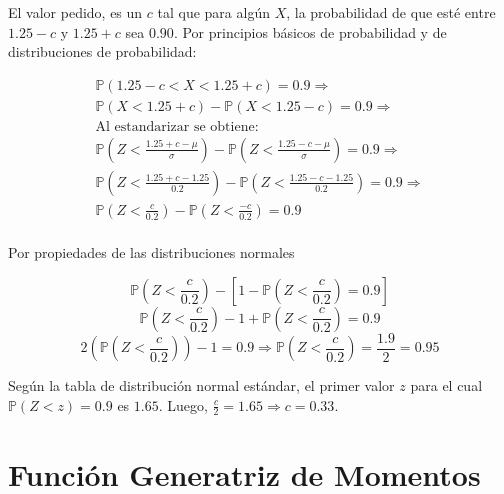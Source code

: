 \documentclass[11pt, spanish]{article}
\begin{document}
\begin{enumerate}[(a)]
El valor pedido, es un $c$ tal que para algún $X$, la probabilidad de que esté entre $1.25 - c$ y $1.25 + c$ sea $0.90$. Por principios básicos de probabilidad y de distribuciones de probabilidad:

\begin{equation}
    \begin{aligned}
   \mathbb{P}\left(1.25 - c < X < 1.25 + c \right) = 0.9 \Rightarrow   \\
  \mathbb{P}\left(X < 1.25 + c\right) -   \mathbb{P}\left(X < 1.25 - c\right) = 0.9 \Rightarrow\\
  \mbox{Al estandarizar se obtiene:} \\
  \mathbb{P}\left(Z < \frac{1.25 + c - \mu}{\sigma} \right) - \mathbb{P}\left(Z < \frac{1.25 - c - \mu}{\sigma} \right) = 0.9 \Rightarrow \\
  \mathbb{P}\left(Z < \frac{1.25 + c - 1.25}{0.2} \right) - \mathbb{P}\left(Z < \frac{1.25 - c - 1.25}{0.2} \right) = 0.9 \Rightarrow  \\
  \mathbb{P}\left(Z < \frac{c}{0.2} \right) - \mathbb{P}\left(Z < \frac{- c}{0.2} \right) = 0.9 \\
\end{aligned}
\end{equation}

\pagebreak
Por propiedades de las distribuciones normales

$$  \mathbb{P}\left(Z < \frac{c}{0.2} \right) - \left[ 1 - \mathbb{P}\left(Z < \frac{c}{0.2} \right) = 0.9 \right] $$
$$  \mathbb{P}\left(Z < \frac{c}{0.2} \right) - 1 + \mathbb{P}\left(Z < \frac{c}{0.2} \right) = 0.9 $$
$$  2\left(\mathbb{P}\left(Z < \frac{c}{0.2} \right)\right) - 1  = 0.9 \Rightarrow \mathbb{P}\left(Z < \frac{c}{0.2} \right) = \frac{1.9}{2} = 0.95$$

Según la tabla de distribución normal estándar, el primer valor $z$ para el cual $\mathbb{P}\left(Z < z \right) = 0.9$ es $1.65$. Luego, $\frac{c}{2} = 1.65 \Rightarrow c = 0.33$.



\end{enumerate}

\pagebreak
\section{Función Generatriz de Momentos}
\end{document}
